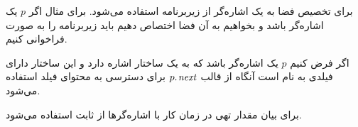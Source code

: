برای تخصیص فضا به یک اشاره‌گر از زیربرنامه {} استفاده می‌شود. برای مثال اگر {$p$} یک اشاره‌گر باشد و بخواهیم به آن فضا اختصاص دهیم باید زیربرنامه {} را به صورت {} فراخوانی کنیم.

اگر فرض کنیم {$p$} یک اشاره‌گر باشد که به یک ساختار اشاره دارد و این ساختار دارای فیلدی به نام {} است آنگاه از قالب {$p.\hspace*{1pt}\mathit{next}$} برای دسترسی به محتوای فیلد {} استفاده می‌شود.

برای بیان مقدار تهی در زمان کار با اشاره‌گرها از ثابت {} استفاده می‌شود.